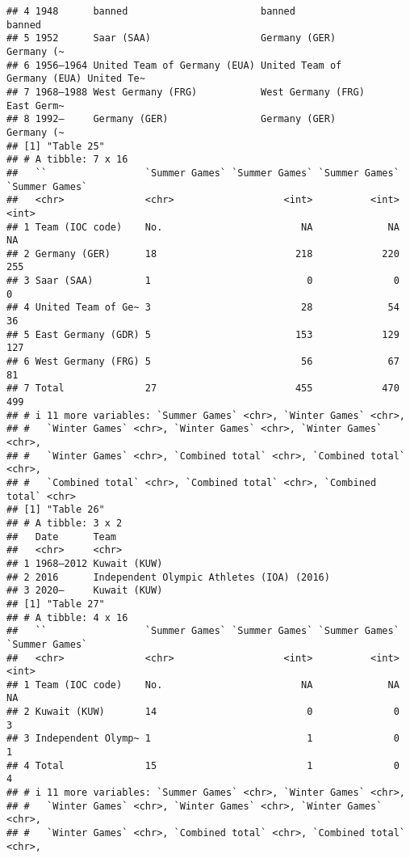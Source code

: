 \documentclass[
]{article}
\begin{document}
\begin{verbatim}
## 4 1948      banned                       banned                       banned    
## 5 1952      Saar (SAA)                   Germany (GER)                Germany (~
## 6 1956–1964 United Team of Germany (EUA) United Team of Germany (EUA) United Te~
## 7 1968–1988 West Germany (FRG)           West Germany (FRG)           East Germ~
## 8 1992–     Germany (GER)                Germany (GER)                Germany (~
## [1] "Table 25"
## # A tibble: 7 x 16
##   ``                 `Summer Games` `Summer Games` `Summer Games` `Summer Games`
##   <chr>              <chr>                   <int>          <int>          <int>
## 1 Team (IOC code)    No.                        NA             NA             NA
## 2 Germany (GER)      18                        218            220            255
## 3 Saar (SAA)         1                           0              0              0
## 4 United Team of Ge~ 3                          28             54             36
## 5 East Germany (GDR) 5                         153            129            127
## 6 West Germany (FRG) 5                          56             67             81
## 7 Total              27                        455            470            499
## # i 11 more variables: `Summer Games` <chr>, `Winter Games` <chr>,
## #   `Winter Games` <chr>, `Winter Games` <chr>, `Winter Games` <chr>,
## #   `Winter Games` <chr>, `Combined total` <chr>, `Combined total` <chr>,
## #   `Combined total` <chr>, `Combined total` <chr>, `Combined total` <chr>
## [1] "Table 26"
## # A tibble: 3 x 2
##   Date      Team                                     
##   <chr>     <chr>                                    
## 1 1968–2012 Kuwait (KUW)                             
## 2 2016      Independent Olympic Athletes (IOA) (2016)
## 3 2020–     Kuwait (KUW)                             
## [1] "Table 27"
## # A tibble: 4 x 16
##   ``                 `Summer Games` `Summer Games` `Summer Games` `Summer Games`
##   <chr>              <chr>                   <int>          <int>          <int>
## 1 Team (IOC code)    No.                        NA             NA             NA
## 2 Kuwait (KUW)       14                          0              0              3
## 3 Independent Olymp~ 1                           1              0              1
## 4 Total              15                          1              0              4
## # i 11 more variables: `Summer Games` <chr>, `Winter Games` <chr>,
## #   `Winter Games` <chr>, `Winter Games` <chr>, `Winter Games` <chr>,
## #   `Winter Games` <chr>, `Combined total` <chr>, `Combined total` <chr>,

\end{verbatim}
\end{document}
